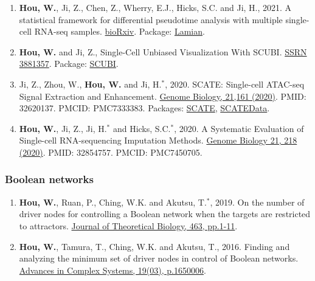 \documentclass[10pt,letterpaper]{article}
\begin{document}
\begin{enumerate}[nosep]

\item {\bf Hou, W.}, Ji, Z., Chen, Z., Wherry, E.J., Hicks, S.C.\* and Ji, H.\*, 2021. A statistical framework for differential pseudotime analysis with multiple single-cell RNA-seq samples. \href{https://www.biorxiv.org/content/10.1101/2021.07.10.451910v1.abstract}{bioRxiv}. Package: \href{https://github.com/Winnie09/Lamian}{Lamian}.

\item {\bf Hou, W.} and Ji, Z., Single-Cell Unbiased Visualization With SCUBI. \href{https://papers.ssrn.com/sol3/papers.cfm?abstract_id=3881357}{SSRN 3881357}. Package: \href{https://github.com/Winnie09/scubi}{SCUBI}.

\item Ji, Z., Zhou, W., {\bf Hou, W.} and Ji, H.$^{\ast}$, 2020. SCATE: Single-cell ATAC-seq Signal Extraction and Enhancement. \href{https://genomebiology.biomedcentral.com/articles/10.1186/s13059-020-02075-3}{Genome Biology, 21,161 (2020)}. PMID: 32620137. PMCID: PMC7333383. Packages: \href{https://github.com/Winnie09/SCATE}{SCATE}, \href{https://github.com/Winnie09/SCATEData}{SCATEData}.

\item {\bf Hou, W.}, Ji, Z., Ji, H.$^{\ast}$ and Hicks, S.C.$^{\ast}$, 2020. A Systematic Evaluation of Single-cell RNA-sequencing Imputation Methods. \href{https://genomebiology.biomedcentral.com/articles/10.1186/s13059-020-02132-x}{Genome Biology 21, 218 (2020)}. PMID: 32854757. PMCID: PMC7450705.
\end{enumerate}

\subsubsection*{Boolean networks}
\begin{enumerate}
\item {\bf Hou, W.}, Ruan, P., Ching, W.K. and Akutsu, T.$^{\ast}$, 2019. On the number of driver nodes for controlling a Boolean network when the targets are restricted to attractors. \href{https://www.sciencedirect.com/science/article/pii/S0022519318306027}{Journal of Theoretical Biology, 463, pp.1-11}.

\item {\bf Hou, W.}, Tamura, T., Ching, W.K. and Akutsu, T., 2016. Finding and analyzing the minimum set of driver nodes in control of Boolean networks. \href{https://www.worldscientific.com/doi/abs/10.1142/S0219525916500065}{Advances in Complex Systems, 19(03), p.1650006}.
\end{enumerate}
\end{document}
